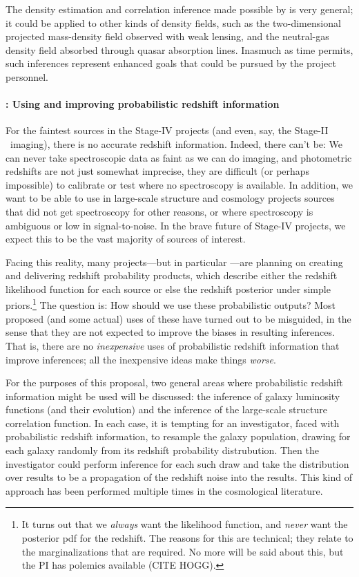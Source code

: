 \documentclass[12pt]{article}
\begin{document}
The density estimation and correlation inference made possible by
 is very general; it could be applied to other
kinds of density fields, such as the two-dimensional projected
mass-density field observed with weak lensing, and the neutral-gas
density field absorbed through quasar absorption lines.
Inasmuch as time permits, such inferences represent enhanced goals
that could be pursued by the project personnel.

\paragraph{: Using and improving probabilistic redshift information}

For the faintest sources in the Stage-IV projects (and even, say, the
Stage-II \sdss\ imaging), there is no accurate redshift information.
Indeed, there can't be:
We can never take spectroscopic data as faint as we can do imaging,
and photometric redshifts are not just somewhat imprecise, they are
difficult (or perhaps impossible) to calibrate or test where no
spectroscopy is available.
In addition, we want to be able to use in large-scale structure and
cosmology projects sources that did not get spectroscopy for other
reasons, or where spectroscopy is ambiguous or low in signal-to-noise.
In the brave future of Stage-IV projects, we expect this to be the
vast majority of sources of interest.

Facing this reality, many projects---but in particular \lsst---are
planning on creating and delivering redshift probability products,
which describe either the redshift likelihood function for each source
or else the redshift posterior under simple priors.\footnote{It turns
  out that we \emph{always} want the likelihood function, and
  \emph{never} want the posterior pdf for the redshift.  The reasons
  for this are technical; they relate to the marginalizations that are
  required.  No more will be said about this, but the PI has polemics
  available (CITE HOGG).}
The question is:  How should we use these probabilistic outputs?
Most proposed (and some actual) uses of these have turned out to be
misguided, in the sense that they are not expected to improve the
biases in resulting inferences.
That is, there are no \emph{inexpensive} uses of probabilistic
redshift information that improve inferences; all the inexpensive
ideas make things \emph{worse}.

For the purposes of this proposal, two general areas where
probabilistic redshift information might be used will be discussed:
the inference of galaxy luminosity functions (and their evolution) and
the inference of the large-scale structure correlation function.
In each case, it is tempting for an investigator, faced with
probabilistic redshift information, to resample the galaxy population,
drawing for each galaxy randomly from its redshift probability
distrubution.
Then the investigator could perform inference for each such draw and
take the distribution over results to be a propagation of the redshift
noise into the results.
This kind of approach has been performed multiple times in the
cosmological literature.
\end{document}
